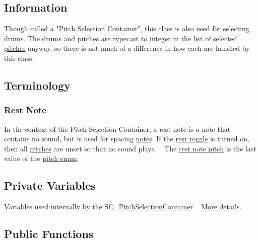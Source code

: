\hypertarget{group___doc_s_c___p_s_c_DocSC_PSCInfo}{}\subsection{Information}\label{group___doc_s_c___p_s_c_DocSC_PSCInfo}
Though called a "Pitch Selection Container", this class is also used for selecting \hyperlink{group___music_enums_gade475b4382c7066d1af13e7c13c029b6}{drums}. The \hyperlink{group___music_enums_gade475b4382c7066d1af13e7c13c029b6}{drums} and \hyperlink{group___music_enums_ga508f69b199ea518f935486c990edac1d}{pitches} are typecast to integer in the \hyperlink{group___s_c___p_s_c_priv_var_ga5a8a5c31158f6af7f0c17d4fd03c5641}{list of selected pitches} anyway, so there is not much of a difference in how each are handled by this class.\hypertarget{group___doc_s_c___p_s_c_DocSC_PSCTerminology}{}\subsection{Terminology}\label{group___doc_s_c___p_s_c_DocSC_PSCTerminology}
\hypertarget{group___doc_s_c___p_s_c_DocSC_PSCRest}{}\subsubsection{Rest Note}\label{group___doc_s_c___p_s_c_DocSC_PSCRest}
In the context of the Pitch Selection Container, a rest note is a note that contains no sound, but is used for spacing \hyperlink{group___music_structs_struct_music_1_1_combined_note}{notes}. If the \hyperlink{group___s_c___p_s_c_priv_var_gae4378d4e0b53501eb0f55b8af38a5a8c}{rest toggle} is turned on, then all \hyperlink{group___music_enums_ga508f69b199ea518f935486c990edac1d}{pitches} are unset so that no sound plays. ~\newline
 The \hyperlink{group___music_enums_gga508f69b199ea518f935486c990edac1da50780f47f6839d47d60bc4555ee00c3f}{rest note pitch} is the last value of the \hyperlink{group___music_enums_ga508f69b199ea518f935486c990edac1d}{pitch enum}.\hypertarget{group___doc_s_c___p_s_c_DocSC_PSCPrivVar}{}\subsection{Private Variables}\label{group___doc_s_c___p_s_c_DocSC_PSCPrivVar}
Variables used internally by the \hyperlink{class_s_c___pitch_selection_container}{S\+C\+\_\+\+Pitch\+Selection\+Container} ~\newline
 \hyperlink{group___s_c___p_s_c_priv_var}{More details}.\hypertarget{group___doc_s_c___p_s_c_DocSC_PSCPubFunc}{}\subsection{Public Functions}\label{group___doc_s_c___p_s_c_DocSC_PSCPubFunc}
